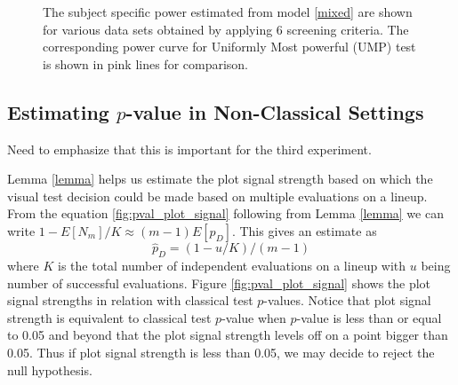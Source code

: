 \documentclass{article}
\newcommand{\green}[1]{{\color{green} #1}} %
\begin{document}
\begin{figure}[hbtp]
   \centering
      \caption{The subject specific power estimated from model \ref{mixed} are shown for various data sets obtained by applying 6 screening criteria.  The corresponding power curve for Uniformly Most powerful (UMP) test is shown in pink lines for comparison.}
       \label{fig:power_screening_subject}	
\end{figure}


\subsection{Estimating $p$-value in Non-Classical Settings} 

\green{Need to emphasize that this is important for the third experiment.}

Lemma \ref{lemma} helps us estimate the plot signal strength based on which the visual test decision could be made based on multiple evaluations on a lineup. From the equation \ref{fig:pval_plot_signal} following from Lemma \ref{lemma} we can write $1 - E[N_m]/K \approx (m-1)E[p_D] $. This gives an estimate as  $$\hat p_D= (1- u/K)/(m-1)$$ where $K$ is the total number of independent evaluations on a lineup with $u$ being number of successful evaluations. Figure \ref{fig:pval_plot_signal} shows the plot signal strengths in relation with classical test $p$-values. Notice that plot signal strength is equivalent to classical test $p$-value when $p$-value is less than or equal to 0.05 and beyond that the plot signal strength levels off on a point bigger than 0.05. Thus if plot signal strength is less than 0.05, we may decide to reject the null hypothesis.
\end{document}

